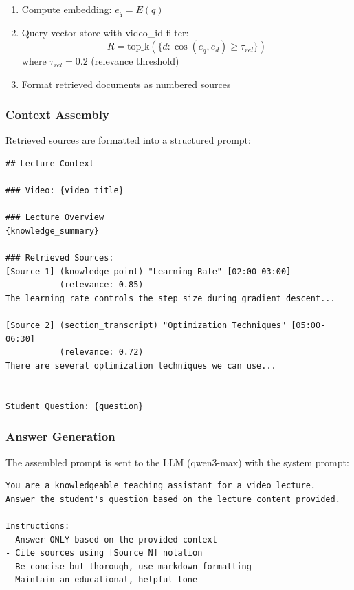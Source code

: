 \documentclass[12pt,a4paper]{article}
\begin{document}
\begin{enumerate}
    \item Compute embedding: $e_q = E(q)$
    \item Query vector store with video\_id filter:
    \begin{equation}
        R = \text{top\_k}(\{d : \cos(e_q, e_d) \geq \tau_{rel}\})
    \end{equation}
    where $\tau_{rel} = 0.2$ (relevance threshold)
    \item Format retrieved documents as numbered sources
\end{enumerate}

\subsubsection{Context Assembly}

Retrieved sources are formatted into a structured prompt:

\begin{lstlisting}[language=text, caption={RAG Context Template}]
## Lecture Context

### Video: {video_title}

### Lecture Overview
{knowledge_summary}

### Retrieved Sources:
[Source 1] (knowledge_point) "Learning Rate" [02:00-03:00] 
           (relevance: 0.85)
The learning rate controls the step size during gradient descent...

[Source 2] (section_transcript) "Optimization Techniques" [05:00-06:30]
           (relevance: 0.72)
There are several optimization techniques we can use...

---
Student Question: {question}
\end{lstlisting}

\subsubsection{Answer Generation}

The assembled prompt is sent to the LLM (qwen3-max) with the system prompt:

\begin{lstlisting}[language=text, caption={RAG System Prompt}]
You are a knowledgeable teaching assistant for a video lecture.
Answer the student's question based on the lecture content provided.

Instructions:
- Answer ONLY based on the provided context
- Cite sources using [Source N] notation
- Be concise but thorough, use markdown formatting
- Maintain an educational, helpful tone
\end{lstlisting}
\end{document}

